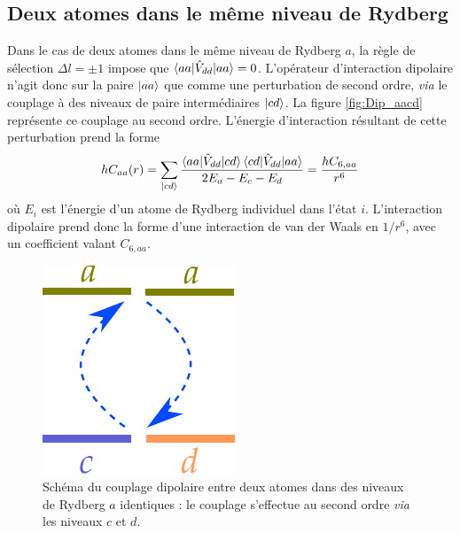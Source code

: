\subsection{Deux atomes dans le même niveau de Rydberg}\label{subsec:interaction_same_level}
Dans le cas de deux atomes dans le même niveau de Rydberg $a$, la règle de sélection $\Delta l = \pm 1$ impose que $\braket{aa|\hat{V}_{dd}|aa} = 0$.
L'opérateur d'interaction dipolaire n'agit donc sur la paire $\ket{aa}$ que comme une perturbation de second ordre, \textit{via} le couplage à des niveaux de paire intermédiaires $\ket{cd}$.
La figure \eqref{fig:Dip_aacd} représente ce couplage au second ordre.
L'énergie d'interaction résultant de cette perturbation prend la forme
\begin{equation}\label{eq:VdW_aacd}
hC_{aa}(r)=\sum_{\ket{cd}}{\frac{\braket{aa|\hat{V}_{dd}|cd}\braket{cd|\hat{V}_{dd}|aa}}{2E_a - E_c - E_d}}  = \frac{hC_{6,aa}}{r^6}
\end{equation}
où $E_i$ est l'énergie d'un atome de Rydberg individuel dans l'état $i$.
L'interaction dipolaire prend donc la forme d'une interaction de van der Waals en $1/r^6$, avec un coefficient valant $C_{6,aa}$.

\begin{figure}[!h]
\centering

\includegraphics[width=0.3\linewidth]{figures/theory/dipole_coupling_aacd}
\caption[Couplage dipolaire entre mêmes niveaux de Rydberg]{Schéma du couplage dipolaire entre deux atomes dans des niveaux de Rydberg $a$ identiques : le couplage s'effectue au second ordre \textit{via} les niveaux $c$ et $d$.}
\label{fig:Dip_aacd}
\end{figure}

